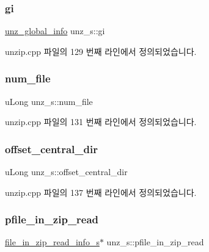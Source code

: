 \subsubsection{\texorpdfstring{gi}{gi}}
{\footnotesize\ttfamily \mbox{\hyperlink{unzip_8h_a18c3b238618ea86ef503ecbd4092dbce}{unz\+\_\+global\+\_\+info}} unz\+\_\+s\+::gi}



unzip.\+cpp 파일의 129 번째 라인에서 정의되었습니다.

\mbox{\label{structunz__s_a737337b347bd5cc52bfabdcfbc11b853}} 
\subsubsection{\texorpdfstring{num\+\_\+file}{num\_file}}
{\footnotesize\ttfamily u\+Long unz\+\_\+s\+::num\+\_\+file}



unzip.\+cpp 파일의 131 번째 라인에서 정의되었습니다.

\mbox{\label{structunz__s_ac6c37ef70549769fa59bca623565d78f}} 
\subsubsection{\texorpdfstring{offset\+\_\+central\+\_\+dir}{offset\_central\_dir}}
{\footnotesize\ttfamily u\+Long unz\+\_\+s\+::offset\+\_\+central\+\_\+dir}



unzip.\+cpp 파일의 137 번째 라인에서 정의되었습니다.

\mbox{\label{structunz__s_a7a5f0568475ad9a36ee2c1f3972406f0}} 
\subsubsection{\texorpdfstring{pfile\+\_\+in\+\_\+zip\+\_\+read}{pfile\_in\_zip\_read}}
{\footnotesize\ttfamily \mbox{\hyperlink{structfile__in__zip__read__info__s}{file\+\_\+in\+\_\+zip\+\_\+read\+\_\+info\+\_\+s}}$\ast$ unz\+\_\+s\+::pfile\+\_\+in\+\_\+zip\+\_\+read}



